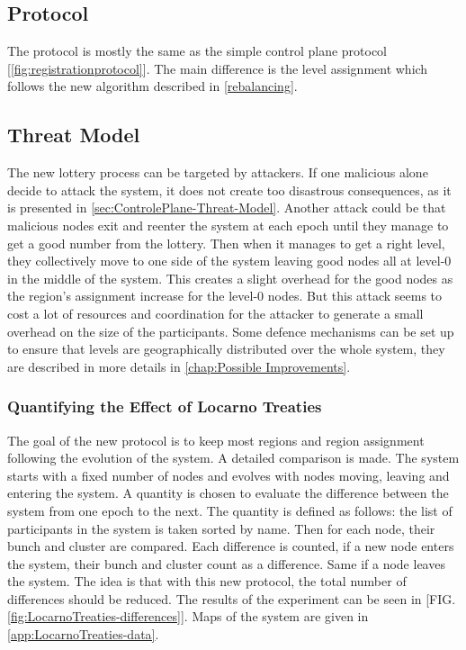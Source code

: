\documentclass[a4paper,11pt,oneside]{report}
\begin{document}
\subsection{Protocol}
The protocol is mostly the same as the simple control plane protocol
[\autoref{fig:registrationprotocol}]. The main difference is the level
assignment which follows the new algorithm described in \autoref{rebalancing}. 

\subsection{Threat Model}

The new lottery process can be targeted by attackers. If one malicious alone
decide to attack the system, it does not create too disastrous consequences, as it is
presented in \autoref{sec:ControlePlane-Threat-Model}. Another attack could be
that malicious nodes exit and reenter the system at each epoch until they
manage to get a good number from the lottery. Then when it manages to get a
right level, they collectively move to one side of the system leaving good nodes
all at level-0 in the middle of the system. This creates a slight overhead
for the good nodes as the region’s assignment increase for the level-0 nodes.
But this attack seems to cost a lot of resources and coordination for the
attacker to generate a small overhead on the size of the participants. Some
defence mechanisms can be set up to ensure that levels are geographically
distributed over the whole system, they are described in more details in
\autoref{chap:Possible Improvements}.

\subsubsection{Quantifying the Effect of Locarno Treaties}
The goal of the new protocol is to keep most regions and region assignment
following the evolution of the system. A detailed comparison is made. The
system starts with a fixed number of nodes and evolves with nodes moving,
leaving and entering the system. A quantity is chosen to evaluate the
difference between the system from one epoch to the next. The quantity is
defined as follows: the list of participants in the system is taken sorted by
name. Then for each node, their bunch and cluster are compared. Each
difference is counted, if a new node enters the system, their bunch and
cluster count as a difference. Same if a node leaves the system. The idea is
that with this new protocol, the total number of differences should be reduced.
The results of the experiment can be seen in [FIG.
\autoref{fig:LocarnoTreaties-differences}]. Maps of the system are given in
\autoref{app:LocarnoTreaties-data}.
\end{document}
